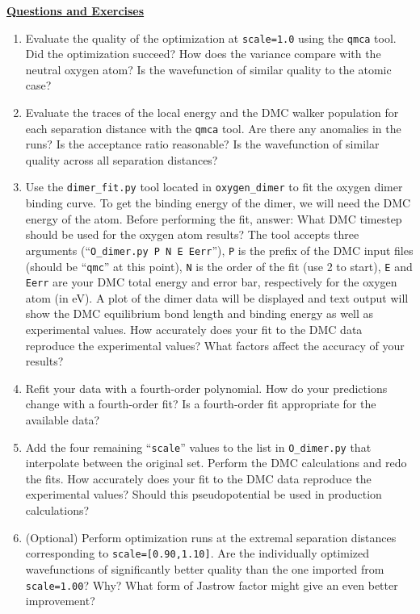 \vspace{3cm}
\begin{flushleft}
\textbf{\underline{Questions and Exercises}}
\end{flushleft}
\begin{enumerate}
  \item{Evaluate the quality of the optimization at \texttt{scale=1.0} using the \texttt{qmca} tool.  Did the optimization succeed?  How does the variance compare with the neutral oxygen atom?  Is the wavefunction of similar quality to the atomic case?}

  \item{Evaluate the traces of the local energy and the DMC walker population for each separation distance with the \texttt{qmca} tool.  Are there any anomalies in the runs?  Is the acceptance ratio reasonable?  Is the wavefunction of similar quality across all separation distances?}

  \item{Use the \texttt{dimer\_fit.py} tool located in \texttt{oxygen\_dimer} to fit the oxygen dimer binding curve.   To get the binding energy of the dimer, we will need the DMC energy of the atom.  Before performing the fit, answer: What DMC timestep should be used for the oxygen atom results?  The tool accepts three arguments (``\texttt{O\_dimer.py P N E Eerr}''}), \texttt{P} is the prefix of the DMC input files (should be ``\texttt{qmc}'' at this point), \texttt{N} is the order of the fit (use 2 to start), \texttt{E} and \texttt{Eerr} are your DMC total energy and error bar, respectively for the oxygen atom (in eV).  A plot of the dimer data will be displayed and text output will show the DMC equilibrium bond length and binding energy as well as experimental values.  How accurately does your fit to the DMC data reproduce the experimental values?  What factors affect the accuracy of your results? 

  \item{Refit your data with a fourth-order polynomial.  How do your predictions change with a fourth-order fit?  Is a fourth-order fit appropriate for the available data?}
 
  \item{Add the four remaining ``\texttt{scale}'' values to the list in \texttt{O\_dimer.py} that interpolate between the original set.  Perform the DMC calculations and redo the fits.  How accurately does your fit to the DMC data reproduce the experimental values?  Should this pseudopotential be used in production calculations?}

  \item{(Optional) Perform optimization runs at the extremal separation distances corresponding to \texttt{scale=[0.90,1.10]}}.  Are the individually optimized wavefunctions of significantly better quality than the one imported from \texttt{scale=1.00}?  Why?  What form of Jastrow factor might give an even better improvement? 
\end{enumerate}





